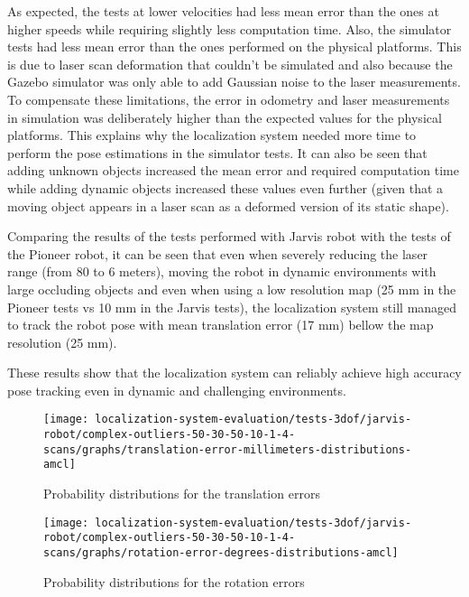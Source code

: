 As expected, the tests at lower velocities had less mean error than the ones at higher speeds while requiring slightly less computation time. Also, the simulator tests had less mean error than the ones performed on the physical platforms. This is due to laser scan deformation that couldn't be simulated and also because the Gazebo simulator was only able to add Gaussian noise to the laser measurements. To compensate these limitations, the error in odometry and laser measurements in simulation was deliberately higher than the expected values for the physical platforms. This explains why the localization system needed more time to perform the pose estimations in the simulator tests. It can also be seen that adding unknown objects increased the mean error and required computation time while adding dynamic objects increased these values even further (given that a moving object appears in a laser scan as a deformed version of its static shape).

Comparing the results of the tests performed with Jarvis robot  with the tests of the Pioneer robot, it can be seen that even when severely reducing the laser range (from 80 to 6 meters), moving the robot in dynamic environments with large occluding objects and even when using a low resolution map (25 mm in the Pioneer tests vs 10 mm in the Jarvis tests), the localization system still managed to track the robot pose with mean translation error (17 mm) bellow the map resolution (25 mm).

These results show that the localization system can reliably achieve high accuracy pose tracking even in dynamic and challenging environments.

\begin{figure}[H]
	\centering
	\begin{minipage}[H]{0.47\textwidth}
		\centering
		\texttt{[image: localization-system-evaluation/tests-3dof/jarvis-robot/complex-outliers-50-30-50-10-1-4-scans/graphs/translation-error-millimeters-distributions-amcl]}
		\caption{Probability distributions for the  translation errors}
		\label{fig:localization-system-evaluation_complex-path-with-outliers-50-30-50-10cm-per-sec-velocity-1-4-translation-error-amcl}
	\end{minipage}\hfill
	\begin{minipage}[H]{0.47\textwidth}
		\centering
		\texttt{[image: localization-system-evaluation/tests-3dof/jarvis-robot/complex-outliers-50-30-50-10-1-4-scans/graphs/rotation-error-degrees-distributions-amcl]}
		\caption{Probability distributions for the  rotation errors}
		\label{fig:localization-system-evaluation_complex-path-with-outliers-50-30-50-10cm-per-sec-velocity-1-4-rotation-error-amcl}
	\end{minipage}
\end{figure}

